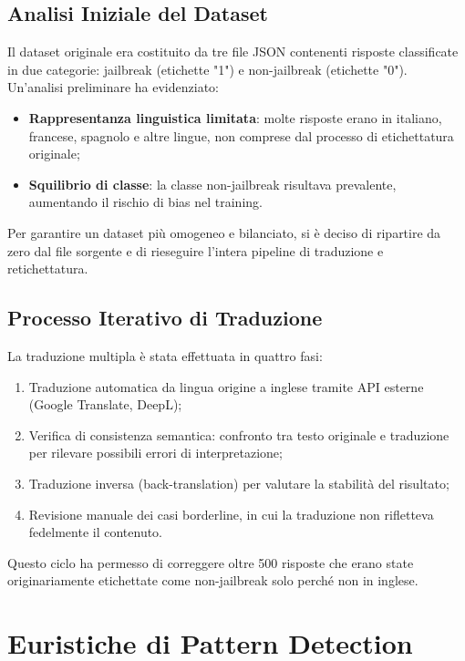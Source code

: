 \documentclass[a4paper,12pt]{article}
\begin{document}
\subsection{Analisi Iniziale del Dataset}
Il dataset originale era costituito da tre file JSON contenenti risposte classificate in due categorie: jailbreak (etichette "1") e non-jailbreak (etichette "0"). Un'analisi preliminare ha evidenziato:
\begin{itemize}
  \item \textbf{Rappresentanza linguistica limitata}: molte risposte erano in italiano, francese, spagnolo e altre lingue, non comprese dal processo di etichettatura originale;
  \item \textbf{Squilibrio di classe}: la classe non-jailbreak risultava prevalente, aumentando il rischio di bias nel training.
\end{itemize}
Per garantire un dataset più omogeneo e bilanciato, si è deciso di ripartire da zero dal file sorgente e di rieseguire l'intera pipeline di traduzione e retichettatura.

\subsection{Processo Iterativo di Traduzione}
La traduzione multipla è stata effettuata in quattro fasi:
\begin{enumerate}
  \item Traduzione automatica da lingua origine a inglese tramite API esterne (Google Translate, DeepL);
  \item Verifica di consistenza semantica: confronto tra testo originale e traduzione per rilevare possibili errori di interpretazione;
  \item Traduzione inversa (back-translation) per valutare la stabilità del risultato;
  \item Revisione manuale dei casi borderline, in cui la traduzione non rifletteva fedelmente il contenuto.
\end{enumerate}
Questo ciclo ha permesso di correggere oltre 500 risposte che erano state originariamente etichettate come non-jailbreak solo perché non in inglese.

\section{Euristiche di Pattern Detection}
\end{document}
